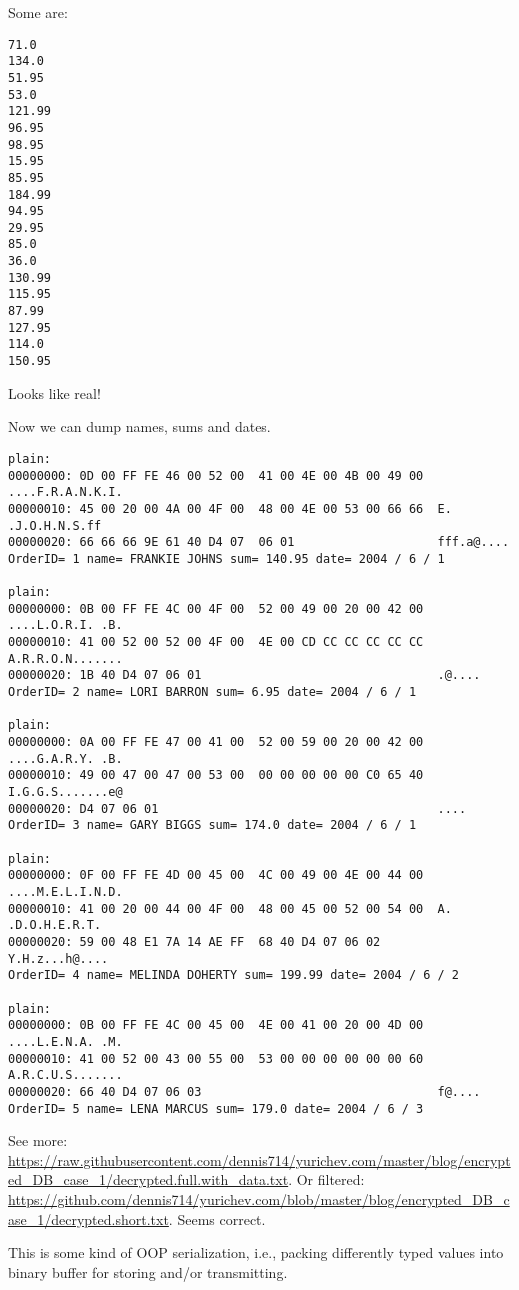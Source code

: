 Some are:

\begin{lstlisting}
71.0
134.0
51.95
53.0
121.99
96.95
98.95
15.95
85.95
184.99
94.95
29.95
85.0
36.0
130.99
115.95
87.99
127.95
114.0
150.95
\end{lstlisting}

Looks like real!

Now we can dump names, sums and dates.

\begin{lstlisting}
plain:
00000000: 0D 00 FF FE 46 00 52 00  41 00 4E 00 4B 00 49 00  ....F.R.A.N.K.I.
00000010: 45 00 20 00 4A 00 4F 00  48 00 4E 00 53 00 66 66  E. .J.O.H.N.S.ff
00000020: 66 66 66 9E 61 40 D4 07  06 01                    fff.a@....
OrderID= 1 name= FRANKIE JOHNS sum= 140.95 date= 2004 / 6 / 1

plain:
00000000: 0B 00 FF FE 4C 00 4F 00  52 00 49 00 20 00 42 00  ....L.O.R.I. .B.
00000010: 41 00 52 00 52 00 4F 00  4E 00 CD CC CC CC CC CC  A.R.R.O.N.......
00000020: 1B 40 D4 07 06 01                                 .@....
OrderID= 2 name= LORI BARRON sum= 6.95 date= 2004 / 6 / 1

plain:
00000000: 0A 00 FF FE 47 00 41 00  52 00 59 00 20 00 42 00  ....G.A.R.Y. .B.
00000010: 49 00 47 00 47 00 53 00  00 00 00 00 00 C0 65 40  I.G.G.S.......e@
00000020: D4 07 06 01                                       ....
OrderID= 3 name= GARY BIGGS sum= 174.0 date= 2004 / 6 / 1

plain:
00000000: 0F 00 FF FE 4D 00 45 00  4C 00 49 00 4E 00 44 00  ....M.E.L.I.N.D.
00000010: 41 00 20 00 44 00 4F 00  48 00 45 00 52 00 54 00  A. .D.O.H.E.R.T.
00000020: 59 00 48 E1 7A 14 AE FF  68 40 D4 07 06 02        Y.H.z...h@....
OrderID= 4 name= MELINDA DOHERTY sum= 199.99 date= 2004 / 6 / 2

plain:
00000000: 0B 00 FF FE 4C 00 45 00  4E 00 41 00 20 00 4D 00  ....L.E.N.A. .M.
00000010: 41 00 52 00 43 00 55 00  53 00 00 00 00 00 00 60  A.R.C.U.S.......
00000020: 66 40 D4 07 06 03                                 f@....
OrderID= 5 name= LENA MARCUS sum= 179.0 date= 2004 / 6 / 3
\end{lstlisting}

See more: \url{https://raw.githubusercontent.com/dennis714/yurichev.com/master/blog/encrypted_DB_case_1/decrypted.full.with_data.txt}.
Or filtered: \url{https://github.com/dennis714/yurichev.com/blob/master/blog/encrypted_DB_case_1/decrypted.short.txt}.
Seems correct.

This is some kind of OOP serialization, i.e., packing differently typed values into binary buffer for storing and/or transmitting.


